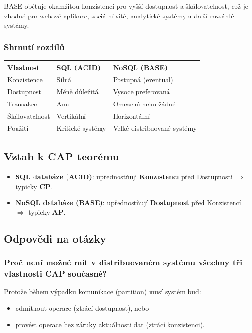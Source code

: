 BASE obětuje okamžitou konzistenci pro vyšší dostupnost a škálovatelnost, což je vhodné pro webové aplikace, sociální sítě, analytické systémy a další rozsáhlé systémy.

\subsubsection*{Shrnutí rozdílů}

\begin{center}
\begin{tabular}{|l|l|l|}
\hline
\textbf{Vlastnost} & \textbf{SQL (ACID)} & \textbf{NoSQL (BASE)} \\
\hline
Konzistence & Silná & Postupná (eventual) \\
\hline
Dostupnost & Méně důležitá & Vysoce preferovaná \\
\hline
Transakce & Ano & Omezené nebo žádné \\
\hline
Škálovatelnost & Vertikální & Horizontální \\
\hline
Použití & Kritické systémy & Velké distribuované systémy \\
\hline
\end{tabular}
\end{center}

\subsection*{Vztah k CAP teorému}

\begin{itemize}
    \item \textbf{SQL databáze (ACID)}: upřednostňují \textbf{Konzistenci} před Dostupností $\Rightarrow$ typicky \textbf{CP}.
    \item \textbf{NoSQL databáze (BASE)}: upřednostňují \textbf{Dostupnost} před Konzistencí $\Rightarrow$ typicky \textbf{AP}.
\end{itemize}

\subsection*{Odpovědi na otázky}

\subsubsection*{Proč není možné mít v distribuovaném systému všechny tři vlastnosti CAP současně?}

Protože během výpadku komunikace (partition) musí systém buď:
\begin{itemize}
    \item odmítnout operace (ztrácí dostupnost), nebo
    \item provést operace bez záruky aktuálnosti dat (ztrácí konzistenci).
\end{itemize}

